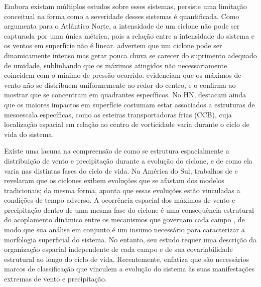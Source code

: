 
Embora existam múltiplos estudos sobre esses sistemas, persiste uma limitação conceitual na forma como a severidade desses sistemas é quantificada. Como argumenta \citet{corner2025classification} para o Atlântico Norte, a intensidade de um ciclone não pode ser capturada por uma única métrica, pois a relação entre a intensidade do sistema e os ventos em superfície não é linear. \citet{sinclair2023relationship} advertem que um ciclone pode ser dinamicamente intenso mas gerar pouca chuva se carecer do suprimento adequado de umidade, sublinhando que os máximos atingidos não necessariamente coincidem com o mínimo de pressão ocorrido. \citet{bitencourt2010relating} evidenciam que os máximos de vento não se distribuem uniformemente ao redor do centro, e \citet{cardoso2022synoptic} o confirma ao mostrar que se concentram em quadrantes específicos. No HN, \citet{eisenstein2023identification} destacam ainda que os maiores impactos em superfície costumam estar associados a estruturas de mesoescala específicas, como as esteiras transportadoras frias (CCB), cuja localização espacial em relação ao centro de vorticidade varia durante o ciclo de vida do sistema.

Existe uma lacuna na compreensão de como se estrutura espacialmente a distribuição de vento e precipitação durante a evolução do ciclone, e de como ela varia nas distintas fases do ciclo de vida.
Na América do Sul, trabalhos de \citet{gozzo2013air} e \citet{reboita2022from} revelaram que os ciclones exibem evoluções que se afastam dos modelos tradicionais; da mesma forma, \citet{marrafon2022classificacao} aponta que essas evoluções estão vinculadas a condições de tempo adverso.
A ocorrência espacial dos máximos de vento e precipitação dentro de uma mesma fase do ciclone é uma consequência estrutural do acoplamento dinâmico entre os mecanismos que governam cada campo \citep{chen2025characteristics}, de modo que sua análise em conjunto é um insumo necessário para caracterizar a morfologia superficial do sistema.
No entanto, seu estudo requer uma descrição da organização espacial independente de cada campo e de sua covariabilidade estrutural ao longo do ciclo de vida. Recentemente, \citet{han2025system} enfatiza que são necessários marcos de classificação que vinculem a evolução do sistema às suas manifestações extremas de vento e precipitação.

